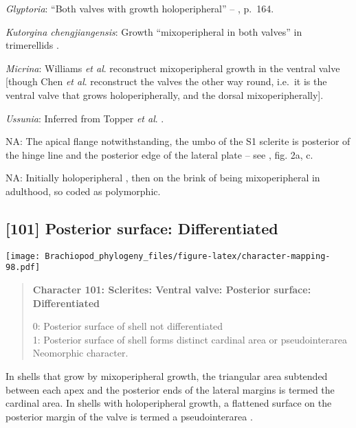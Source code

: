 \documentclass[openany]{book}
\theoremstyle{definition}
\theoremstyle{definition}
\theoremstyle{definition}
\theoremstyle{remark}
\begin{document}
\hypertarget{Glyptoria-coding-100}{}
\emph{Glyptoria}: ``Both valves with growth holoperipheral'' --
\citet{Williams2000LinguliformeaCraniiformea}, p.~164.

\hypertarget{Kutorgina_chengjiangensis-coding-100}{}
\emph{Kutorgina chengjiangensis}: Growth ``mixoperipheral in both
valves'' in trimerellids
\citep{Williams2000LinguliformeaCraniiformea, Popov1997}.

\hypertarget{Micrina-coding-100}{}
\emph{Micrina}: Williams \emph{et al}.
\citeyearpar[2007]{Williams2000LinguliformeaCraniiformea} reconstruct
mixoperipheral growth in the ventral valve {[}though Chen \emph{et al}.
\citeyearpar{Chen2007Reinterpretationof} reconstruct the valves the
other way round, i.e.~it is the ventral valve that grows
holoperipherally, and the dorsal mixoperipherally{]}.

\hypertarget{Ussunia-coding-100}{}
\emph{Ussunia}: Inferred from Topper \emph{et al}.
\citeyearpar{Topper2013Reappraisalof}.

\hypertarget{NA-coding-100}{}
NA: The apical flange notwithstanding, the umbo of the S1 sclerite is
posterior of the hinge line and the posterior edge of the lateral plate
-- see \citet{Larsson2014iPaterimitra}, fig. 2a, c.

\hypertarget{NA-coding-100}{}
NA: Initially holoperipheral \citep[p.~159]{Popov2009Earlyontogeny},
then on the brink of being mixoperipheral in adulthood, so coded as
polymorphic.

\subsection*{{[}101{]} Posterior surface:
Differentiated}\label{posterior-surface-differentiated-1}

\texttt{[image: Brachiopod\_phylogeny\_files/figure-latex/character-mapping-98.pdf]}

\begin{quote}
\textbf{Character 101: Sclerites: Ventral valve: Posterior surface:
Differentiated}

0: Posterior surface of shell not differentiated\\
1: Posterior surface of shell forms distinct cardinal area or
pseudointerarea\\
Neomorphic character.
\end{quote}

In shells that grow by mixoperipheral growth, the triangular area
subtended between each apex and the posterior ends of the lateral
margins is termed the cardinal area. In shells with holoperipheral
growth, a flattened surface on the posterior margin of the valve is
termed a pseudointerarea
\citep[paraphrasing][]{Williams1997Introduction}.
\end{document}

